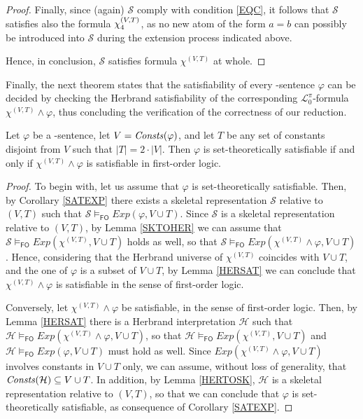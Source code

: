 \documentclass[manyauthors]{fundam}
\newcommand{\Elpizero}{\ensuremath{\mathcal{L}_{0}^{\pi}}\xspace}
\newcommand{\HExp}{Exp}
\newcommand{\atset}{\mathcal{S}}
\newcommand{\consta}{a}
\newcommand{\constb}{b}
\newcommand{\hinter}{\ensuremath{\mathcal{H}}}
\newcommand{\fomodels}[2]{#1 \models_{\mathsf{FO}} #2}
\begin{document}
\begin{proof}

Finally, since (again) $\atset$ comply with condition \ref{EQC},
it follows that $\atset$ satisfies also the formula $\chi_4^{(V,T)}$,
as no new atom of the form $\consta = \constb$ can
possibly be introduced into $\atset$ during the extension process
indicated above.

Hence, in conclusion, $\atset$ satisfies formula
$\chi^{(V,T)}$ at whole.%
\end{proof}
%
Finally, the next theorem states that the satisfiability of every
\Forallpizero-sentence $\varphi$ can be decided by checking the
Herbrand satisfiability of the corresponding \Elpizero-formula
$\chi^{(V,T)} \wedge \varphi$, thus concluding the verification of the
correctness of our reduction.

\begin{theorem}\label{FORALLPIZEROSAT}
Let $\varphi$ be a \Forallpizero-sentence, let $V=\mathit{Consts}(\varphi)$,
and let $T$ be any set of constants disjoint from $V$ such that $|T|=2\cdot|V|$.  Then $\varphi$ is set-theoretically 
satisfiable if and only if $\chi^{(V,T)} \wedge \varphi$ is 
satisfiable in first-order logic.
\end{theorem}
\begin{proof}
To begin with, let us assume that $\varphi$ is set-theoretically satisfiable.  Then, by
Corollary \ref{SATEXP}  there exists a skeletal representation $\atset$ relative to $(V,T)$ such that 
$\fomodels{\atset}{\HExp(\varphi, V \cup T)}$. Since $\atset$ is a skeletal representation relative to $(V,T)$, by Lemma \ref{SKTOHER} we can assume that
$\fomodels{\atset}{\HExp(\chi^{(V,T)}, V \cup T)}$ holds as well, so that
$\fomodels{\atset}{\HExp(\chi^{(V,T)} \wedge \varphi, V \cup T)}$. Hence, considering that the Herbrand universe of $\chi^{(V,T)}$ coincides with $V \cup T$, and
the one of $\varphi$ is a subset of $V \cup T$, by Lemma \ref{HERSAT} we can conclude
that $\chi^{(V,T)} \wedge \varphi$ is satisfiable in the sense of first-order
logic.

Conversely, let $\chi^{(V,T)} \wedge \varphi$ be satisfiable,
in the sense of first-order logic. Then, by  Lemma \ref{HERSAT} there is a Herbrand
interpretation $\hinter$ such that 
$\fomodels{\hinter}{\HExp(\chi^{(V,T)}\wedge\varphi, V \cup T)}$, so that 
$\fomodels{\hinter}{\HExp(\chi^{(V,T)}, V \cup T)}$
and $\fomodels{\hinter}{\HExp(\varphi, V \cup T)}$ must hold as well.
Since $\HExp(\chi^{(V,T)}\wedge\varphi, V \cup T)$ involves  
constants in $V \cup T$ only, we can 
assume, without loss of generality, that 
$\Consts(\hinter)\subseteq V \cup T$.
In addition, by Lemma \ref{HERTOSK}, 
$\hinter$ is a skeletal representation relative to 
$(V,T)$, so that we can conclude that $\varphi$ is set-theoretically 
satisfiable, as consequence
of Corollary \ref{SATEXP}. %
\end{proof}
\end{document}
